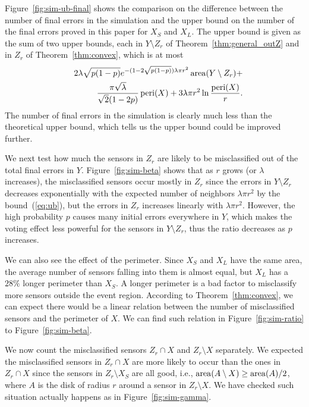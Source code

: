 \documentclass{article}
\def\area{\mathop{\rm area}}
\def\peri{\mathop{\rm peri}}
\begin{document}
\par
Figure~\ref{fig:sim-ub-final} shows the comparison on the difference between the number of final errors in the simulation and the upper bound on the number of the final errors proved in this paper for $X_S$ and $X_L$. The upper bound is given as the sum of two upper bounds, each in $Y\setminus Z_r$ of Theorem~\ref{thm:general_outZ} and in $Z_r$ of Theorem~\ref{thm:convex}, which is at most
\begin{eqnarray}
 & & 2\lambda \sqrt{p(1-p)}e^{-(1-2\sqrt{p(1-p)})\lambda\pi r^2}\area(Y\setminus Z_r) + \nonumber \\
 & & {\pi\sqrt{\lambda}\over \sqrt{2}(1-2p)} \peri(X) + 3 \lambda\pi r^2 \ln{\peri(X)\over r}\label{eq:ub}.
\end{eqnarray}
The number of final errors in the simulation is clearly much less than the theoretical upper bound, which tells us the upper bound could be improved further.

\par
We next test how much the sensors in $Z_r$ are likely to be misclassified out of the total final errors in $Y$. Figure~\ref{fig:sim-beta} shows that as $r$ grows (or $\lambda$ increases), the misclassified sensors occur mostly in $Z_r$ since the errors in $Y\setminus Z_r$ decreases exponentially with the expected number of neighbors $\lambda \pi r^2$ by the bound~(\ref{eq:ub}), but the errors in $Z_r$ increases linearly with $\lambda \pi r^2$. However, the high probability $p$ causes many initial errors everywhere in $Y$, which makes the voting effect less powerful for the sensors in $Y\setminus Z_r$, thus the ratio decreases as $p$ increases.

We can also see the effect of the perimeter. Since $X_S$ and $X_L$ have the same area, the average number of sensors falling into them is almost equal, but $X_L$ has a $28\%$ longer perimeter than $X_S$. A longer perimeter is a bad factor to misclassify more sensors outside the event region. According to Theorem~\ref{thm:convex}, we can expect there would be a linear relation between the number of misclassified sensors and the perimeter of $X$. We can find such relation in Figure~\ref{fig:sim-ratio} to Figure~\ref{fig:sim-beta}.

\par
We now count the misclassified sensors $Z_r\cap X$ and $Z_r \setminus X$ separately. We expected the misclassified sensors in $Z_r\cap X$ are more likely to occur than the ones in $Z_r \cap X$ since the sensors in $Z_r\setminus X_S$ are all good, i.e., $\area(A\setminus X) \geq \area(A)/2$, where $A$ is the disk of radius $r$ around a sensor in $Z_r \setminus X$. We have checked such situation actually happens as in Figure~\ref{fig:sim-gamma}.
\end{document}
